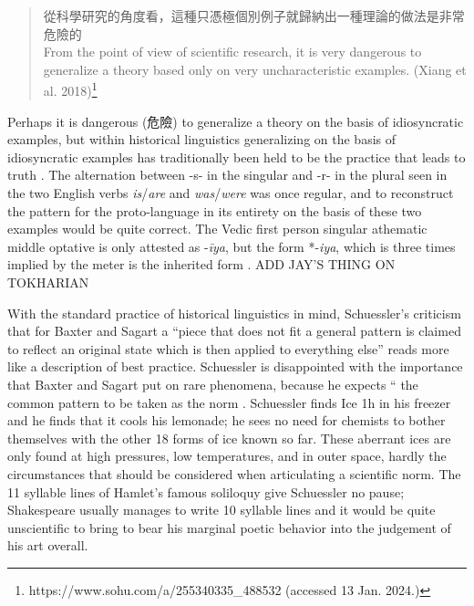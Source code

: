 \begin{quote}
從科學研究的角度看，這種只憑極個別例子就歸納出一種理論的做法是非常危險的 \\
From the point of view of scientific research, it is very dangerous to generalize a theory based only on very uncharacteristic examples. (Xiang et al. 2018)\footnote{https://www.sohu.com/a/255340335_488532 (accessed 13 Jan. 2024.)}
\end{quote}
Perhaps it is dangerous (危險) to generalize a theory on the basis of idiosyncratic examples, but within historical linguistics generalizing on the basis of idiosyncratic examples has traditionally been held to be the  practice that leads to truth \citep[27]{Meillet1925}. 
The alternation between -s- in the singular and -r- in the plural seen in the two English verbs \textit{is}/\textit{are} and \textit{was}/\textit{were} was once regular, and to reconstruct the pattern for the proto-language in its entirety on the basis of these two examples would be quite correct. 
The Vedic first person singular athematic middle optative is only attested as -\textit{īya}, but the form *-\textit{iya}, which is three times implied by the meter is the inherited form \citep[]{Gunkel2022iya}.
ADD JAY'S THING ON TOKHARIAN

With the standard practice of historical linguistics in mind, Schuessler's criticism that for Baxter and Sagart a ``piece that does not fit a general pattern is claimed to reflect an original state which is then applied to everything else'' \citep[577]{Schuessler2015BSrv} reads more like a description of best practice. 
Schuessler is disappointed with the importance that Baxter and Sagart put on rare phenomena, because he expects ``
the common pattern to be taken as the norm \citep[577]{Schuessler2015BSrv}. 
Schuessler finds Ice 1h in his freezer and he finds that it cools his lemonade; he sees no need for chemists to bother themselves with the other 18 forms of ice known so far. These aberrant ices are only found at high pressures, low temperatures, and in outer space, hardly the circumstances that should be considered when articulating a scientific norm. The 11 syllable lines of Hamlet's famous soliloquy give Schuessler no pause; Shakespeare usually manages to write 10 syllable lines and it would be quite unscientific to bring to bear his marginal poetic behavior into the judgement of his art overall. 

